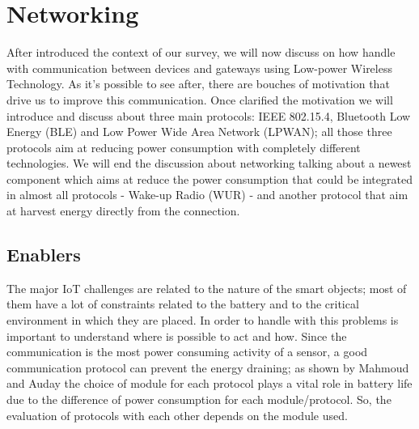 \documentclass[sigconf]{acmart}
\begin{document}
    \section{Networking}
    After introduced the context of our survey, we will now discuss on how handle with communication between devices and gateways using Low-power Wireless Technology. As it's possible to see after, there are bouches of motivation that drive us to improve this communication. Once clarified the motivation we will introduce and discuss about three main protocols: IEEE 802.15.4, Bluetooth Low Energy (BLE) and Low Power Wide Area Network (LPWAN); all those three protocols aim at reducing power consumption with completely different technologies. We will end the discussion about networking talking about a newest component which aims at reduce the power consumption that could be integrated in almost all protocols - Wake-up Radio (WUR) - and another protocol that aim at harvest energy directly from the connection.
    \subsection{Enablers}
    The major IoT challenges are related to the nature of the smart objects; most of them have a lot of constraints related to the battery and to the critical environment in which they are placed. In order to handle with this problems is important to understand where is possible to act and how. Since the communication is the most power consuming activity of a sensor, a good communication protocol can prevent the energy draining; as shown by Mahmoud and Auday \cite{mahmoud} the choice of module for each protocol plays a vital role in battery life due to the difference of power consumption for each module/protocol. So, the evaluation of protocols with each other depends on the module used.
\end{document}
